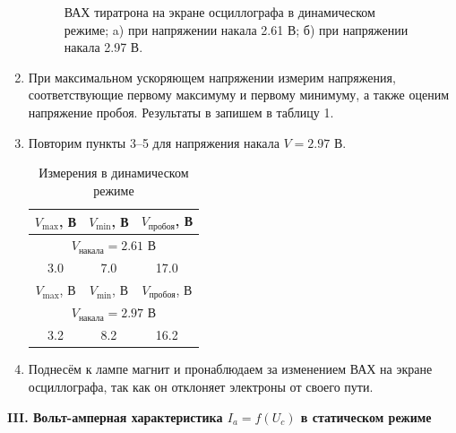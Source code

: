 \documentclass[12pt,a4paper]{article}
\begin{document}
\begin{enumerate}
\begin{figure}[h!]
\begin{minipage}[h]{0.49\linewidth}
			\end{minipage}
			\caption{ВАХ тиратрона на экране осциллографа в динамическом режиме; a) при напряжении накала 2.61 В; б) при напряжении накала 2.97 В.}
		\end{figure}
	
		\item При максимальном ускоряющем напряжении измерим напряжения, соответствующие первому максимуму и первому минимуму, а также оценим напряжение пробоя. Результаты в запишем в таблицу 1.
		
		\item Повторим пункты 3--5 для напряжения накала $V = 2.97$ В.
		
		
		\begin{table}[h!]
			\centering
			\begin{tabular}{|ccc|}
				\hline
				\multicolumn{1}{|c|}{$V_{\text{max}}$, В} & \multicolumn{1}{c|}{$V_\text{min}$, В} & $V_\text{пробоя}$, В \\ \hline
				\multicolumn{3}{|c|}{$V_\text{накала} = 2.61$ В}                                                          \\ \hline
				\multicolumn{1}{|c|}{3.0}                 & \multicolumn{1}{c|}{7.0}              & 17.0                 \\ \hline
				\multicolumn{1}{|c|}{$V_{\text{max}}$, В} & \multicolumn{1}{c|}{$V_\text{min}$, В} & $V_\text{пробоя}$, В \\ \hline
				\multicolumn{3}{|c|}{$V_\text{накала} = 2.97$ В}                                                          \\ \hline
				\multicolumn{1}{|c|}{3.2}                 & \multicolumn{1}{c|}{8.2}              & 16.2                 \\ \hline
			\end{tabular}
			\caption{Измерения в динамическом режиме}
		\end{table}
		
		\item Поднесём к лампе магнит и пронаблюдаем за изменением ВАХ на экране осциллографа, так как он отклоняет электроны от своего пути.
	\end{enumerate}
	
	\begin{center}
		\textbf{III. Вольт-амперная характеристика $I_a = f(U_c)$ в статическом режиме}
	\end{center}
\end{document}
